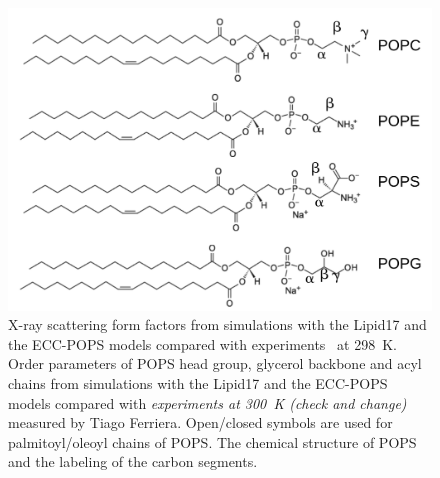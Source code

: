 \begin{figure}[tb!]
  \includegraphics[width=\figwidth]{../img/ecc_pops/lipids_chemfig.pdf} 
  \caption{\label{simVSexpNOions_POPS} 
    X-ray scattering form factors from simulations with the Lipid17 \cite{lipid17-future} and 
    the ECC-POPS models compared with experiments~\cite{SDP-CHARMM36_comparison_paper_Samuli-knows} at 298~K. 
    Order parameters of POPS head group, glycerol backbone and acyl chains  
    from simulations with the Lipid17 \cite{lipid17-future} and the ECC-POPS models 
    compared with \emph{experiments at 300~K (check and change)} measured by Tiago Ferriera. 
    Open/closed symbols are used for palmitoyl/oleoyl chains of POPS. 
    The chemical structure of POPS and the labeling of the carbon segments. 
  }  
\end{figure} 
 
